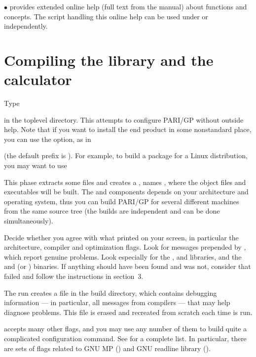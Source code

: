   $\bullet$  provides extended online help (full text from the
manual) about functions and concepts. The script handling this online help
can be used under  or independently.

\section{Compiling the library and the  calculator}

 Type


\noindent in the toplevel directory. This attempts to configure PARI/GP
without outside help. Note that if you want to install the end product in
some nonstandard place, you can use the  option, as in


\noindent (the default prefix is ). For example, to build a
package for a Linux distribution, you may want to use


This phase extracts some files and creates a , names
\kbd{-}, where the
object files and executables will be built. The
 and  components depends on your architecture and
operating system, thus you can build PARI/GP for several different machines
from the same source tree (the builds are independent and can be done
simultaneously).

Decide whether you agree with what  printed on your screen, in
particular the architecture, compiler and optimization flags. Look for
messages prepended by \kbd{\#\#\#}, which report genuine problems.
Look especially for the ,  and  libraries,
and the  and  (or ) binaries.
If anything should have been found and was not, consider that 
failed and follow the instructions in section~3.

The  run creates a file  in the build
directory, which contains debugging information --- in particular, all
messages from compilers ---  that may help diagnose problems. This file
is erased and recreated from scratch each time  is run.

 accepts many other flags, and you may use any number of them
to build quite a complicated configuration command. See  for a complete list. In particular, there are sets of flags related
to GNU MP () and GNU readline library
().


